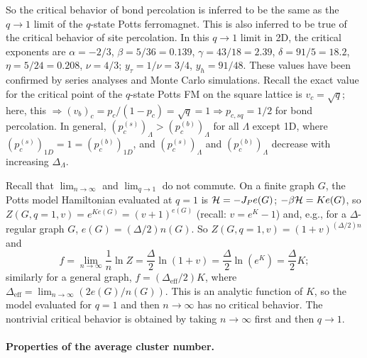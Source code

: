 So the critical behavior of bond percolation is inferred to be the same as the $q\to 1$ limit of the $q$-state Potts
ferromagnet. This is also inferred to be true of the critical behavior of site percolation. In this $q\to 1$ limit in 2D,
the critical exponents are $\alpha = -2/3$, $\beta = 5/36 = 0.139$, $\gamma = 43/18 = 2.39$,
$\delta = 91/5 = 18.2$, $\eta = 5/24 = 0.208$, $\nu = 4/3$; $y_\tau = 1/\nu = 3/4$,
$y_h = 91/48$. These values have been confirmed by series analyses and Monte Carlo simulations. Recall the exact
value for the critical point of the $q$-state Potts FM on the square lattice is $v_c = \sqrt q$; here, this
$\Rightarrow(v_b)_c = p_c/(1-p_c) = \sqrt q = 1\Rightarrow p_{c,sq} = 1/2$ for bond percolation. In general,
$(p_c^{(s)})_\Lambda>(p_c^{(b)})_\Lambda$ for all $\Lambda$ except 1D, where $(p_c^{(s)})_{1D} = 1 = (p_c^{(b)})_{1D}$, and
$(p_c^{(s)})_\Lambda$ and $(p_c^{(b)})_\Lambda$ decrease with increasing $\Delta_\Lambda$.

Recall that $\lim_{n\to\infty}$ and $\lim_{q\to 1}$ do not commute. On a finite graph $G$, the Potts model Hamiltonian
evaluated at $q = 1$ is $\mathcal{H} = -J_Pe(G)$; $-\beta\mathcal{H} = Ke(G)$, so
$Z(G,q=1,v) = e^{Ke(G)} = (v+1)^{e(G)}$ (recall: $v = e^K-1$) and, e.g., for a $\Delta$-regular graph $G$,
$e(G) = (\Delta/2)n(G)$. So $Z(G,q=1,v) = (1+v)^{(\Delta/2)n}$ and
\begin{equation}
  f = \lim_{n\to\infty}\frac{1}{n}\ln Z = \frac{\Delta}{2}\ln(1+v) = \frac{\Delta}{2}\ln(e^K) = \frac{\Delta}{2}K;
\end{equation}
similarly for a general graph, $f = \left(\Delta_{\text{eff}}/2\right)K$, where
$\Delta_{\text{eff}} = \lim_{n\to\infty}(2e(G)/n(G))$. This is an analytic function of $K$, so the model evaluated for
$q = 1$ and then $n\to\infty$ has no critical behavior. The nontrivial critical behavior is obtained by taking $n\to\infty$
first and then $q\to 1$.

\paragraph{Properties of the average cluster number.}


